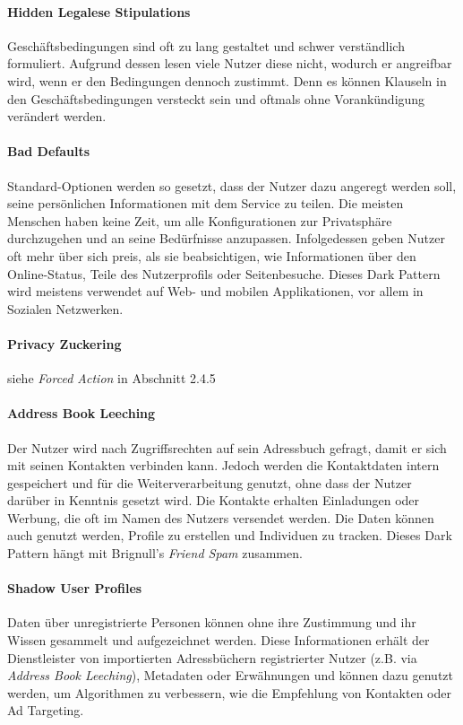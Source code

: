 \documentclass[a4paper]{article}
\newcommand{\todo}[1]{{\color{purple}{#1}}}
\begin{document}
\paragraph{Hidden Legalese Stipulations}
Geschäftsbedingungen sind oft zu lang gestaltet und schwer verständlich formuliert. Aufgrund dessen lesen viele Nutzer diese nicht, wodurch er angreifbar wird, wenn er den Bedingungen dennoch zustimmt. Denn es können Klauseln in den Geschäftsbedingungen versteckt sein und oftmals ohne Vorankündigung verändert werden.  

\paragraph{Bad Defaults}
Standard-Optionen werden so gesetzt, dass der Nutzer dazu angeregt werden soll, seine persönlichen Informationen mit dem Service zu teilen. Die meisten Menschen haben keine Zeit, um alle Konfigurationen zur Privatsphäre durchzugehen und an seine Bedürfnisse anzupassen. Infolgedessen geben Nutzer oft mehr über sich preis, als sie beabsichtigen, wie Informationen über den Online-Status, Teile des Nutzerprofils oder Seitenbesuche. Dieses Dark Pattern wird meistens verwendet auf Web- und mobilen Applikationen, vor allem in Sozialen Netzwerken.  

\paragraph{Privacy Zuckering}
siehe \textit{Forced Action} in Abschnitt 2.4.5

\paragraph{Address Book Leeching}
Der Nutzer wird nach Zugriffsrechten auf sein Adressbuch gefragt, damit er sich mit seinen Kontakten verbinden kann. Jedoch werden die Kontaktdaten intern gespeichert und für die Weiterverarbeitung genutzt, ohne dass der Nutzer darüber in Kenntnis gesetzt wird. Die Kontakte erhalten Einladungen oder Werbung, die oft im Namen des Nutzers versendet werden. Die Daten können auch genutzt werden, Profile zu erstellen und Individuen zu tracken.\newline
Dieses Dark Pattern hängt mit Brignull's \textit{Friend Spam} zusammen. \todo{erläutern?}

\paragraph{Shadow User Profiles}
Daten über unregistrierte Personen können ohne ihre Zustimmung und ihr Wissen gesammelt und aufgezeichnet werden. Diese Informationen erhält der Dienstleister von importierten Adressbüchern registrierter Nutzer (z.B. via \textit{Address Book Leeching}), Metadaten oder Erwähnungen und können dazu genutzt werden, um Algorithmen zu verbessern, wie die Empfehlung von Kontakten oder Ad Targeting.
\end{document}
